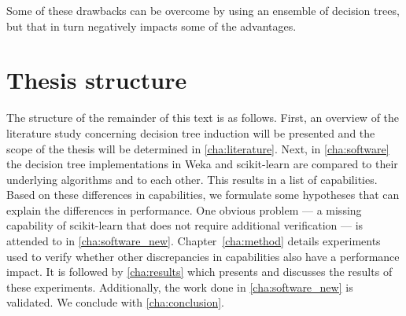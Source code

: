 Some of these drawbacks can be overcome by using an ensemble of decision trees, but that in turn negatively impacts some of the advantages.

\section{Thesis structure}
The structure of the remainder of this text is as follows. First, an overview of the literature study concerning decision tree induction will be presented and the scope of the thesis will be determined in \autoref{cha:literature}. Next, in \autoref{cha:software} the decision tree implementations in Weka and scikit-learn are compared to their underlying algorithms and to each other. This results in a list of capabilities. Based on these differences in capabilities, we formulate some hypotheses that can explain the differences in performance. One obvious problem --- a missing capability of scikit-learn that does not require additional verification --- is attended to in \autoref{cha:software_new}. Chapter~\ref{cha:method} details experiments used to verify whether other discrepancies in capabilities also have a performance impact. It is followed by \autoref{cha:results} which presents and discusses the results of these experiments. Additionally, the work done in \autoref{cha:software_new} is validated. We conclude with \autoref{cha:conclusion}.